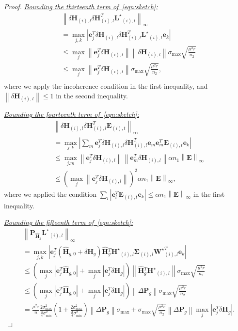 \documentclass[twoside,11pt]{article}
\newcommand{\abs}[1]{\left\vert #1\right\vert}
\newcommand{\norm}[1]{\left\lVert#1\right\rVert}
\newcommand{\matE}{\mathbf{E}}
\newcommand{\hmatH}{{\hat{\mathbf{H}}}{}}
\newcommand{\matHst}{{\mathbf{H}^\star}}
\newcommand{\matLst}{{\mathbf{L}^\star}}
\newcommand{\matP}{\mathbf{P}}
\newcommand{\matSigma}{\mathbf{\Sigma}}
\newcommand{\dtmatH}{\delta\mathbf{H}}
\newcommand{\matWst}{{\mathbf{W}^\star}}
\newcommand{\vece}{\mathbf{e}}
\newcommand{\gop}{\sigma_{\max}}
\newcommand{\B}{\norm{\matE}_{\infty}}
\newcommand{\murnb}{\frac{\mu^2 r}{\overline{n}}}
\newcommand{\sms}{\sigma_{\min}^2}
\newcommand{\tkappa}{\frac{2\gop^2}{\frac{3}{4}\sms}}
\begin{document}
\begin{proof}
\noindent\underline{\it Bounding the thirteenth term of~\eqref{eqn:sketch}:}
\begin{equation}
\label{eqn:thirteenthterm}
\begin{aligned}
&\norm{\dtmatH_{(i),l}\dtmatH_{(i),l}^T\matLst_{(i),l}}_{\infty}\\
&=\max_{j,k}\abs{\vece_j^T\dtmatH_{(i),l}\dtmatH_{(i),l}^T\matLst_{(i),l}\vece_k}\\
&\le \max_j\norm{\vece_j^T\dtmatH_{(i),l}}\norm{\dtmatH_{(i),l}}\gop \sqrt{\frac{\mu^2 r}{n_2}}\\
&\le \max_j\norm{\vece_j^T\dtmatH_{(i),l}}\gop \sqrt{\frac{\mu^2 r}{n_2}},\\
\end{aligned}
\end{equation}
where we apply the incoherence condition in the first inequality, and $\norm{\dtmatH_{(i),l}}\le 1$ in the second inequality.

\noindent\underline{\it Bounding the fourteenth term of~\eqref{eqn:sketch}:}
\begin{align*}
&\norm{\dtmatH_{(i),l}\dtmatH_{(i),l}^T\matE_{(i),t}}_{\infty}\\
&=\max_{j,k}\abs{\sum_m\vece_j^T\dtmatH_{(i),l}\dtmatH_{(i),l}^T\vece_m\vece_m^T\matE_{(i),t}\vece_k}\\
&\le \max_{j.m}\norm{\vece_j^T\dtmatH_{(i),l}}\norm{\vece_m^T\dtmatH_{(i),l}} \alpha n_1\B \\
&\le \left(\max_{j}\norm{\vece_j^T\dtmatH_{(i),l}}\right)^2 \alpha n_1\B,
\end{align*}
where we applied the condition $\sum_l\abs{\vece_l^T\matE_{(i),t}\vece_k}\le \alpha n_1\B$ in the first inequality.

\noindent\underline{\it Bounding the fifteenth term of~\eqref{eqn:sketch}:}
\begin{align*}
&\norm{\matP_{\hmatH_g}\matLst_{(i),l} }_{\infty}\\
&=\max_{j,k}\abs{\vece_j^T \left(\hmatH_{g,0}+\dtmatH_g\right)\hmatH_g^T\matHst_{(i),l}\matSigma_{(i),l}\matWst_{(i),l}^T\vece_k}\\
&\le \left(\max_j\abs{\vece_j^T\hmatH_{g,0}}+\max_j\abs{\vece_j^T\dtmatH_{g}}\right)\norm{\hmatH_g^T\matHst_{(i),l}}\gop \sqrt{\frac{\mu^2 r}{n_2}}\\
&\le \left(\max_j\abs{\vece_j^T\hmatH_{g,0}}+\max_j\abs{\vece_j^T\dtmatH_{g}}\right)\norm{\Delta\matP_g}\gop \sqrt{\frac{\mu^2 r}{n_2}}\\
&=\murnb\tkappa\left(1+\tkappa\right)\norm{\Delta\matP_g}\gop+ \gop \sqrt{\frac{\mu^2 r}{n_2}}\norm{\Delta\matP_g}\max_j\abs{\vece_j^T\dtmatH_{g}}.
\end{align*}


\end{proof}
\end{document}
